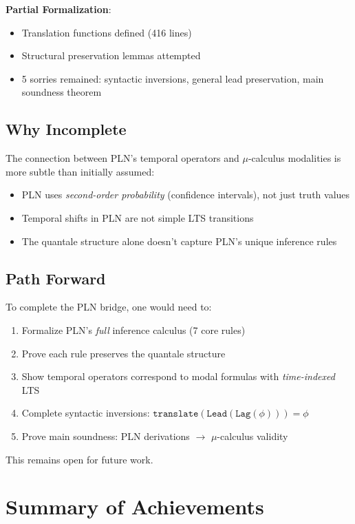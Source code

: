 \documentclass[11pt]{article}
\begin{document}
\textbf{Partial Formalization}:
\begin{itemize}
\item Translation functions defined (416 lines)
\item Structural preservation lemmas attempted
\item 5 sorries remained: syntactic inversions, general lead preservation, main soundness theorem
\end{itemize}

\subsection{Why Incomplete}

The connection between PLN's temporal operators and $\mu$-calculus modalities is more subtle than initially assumed:
\begin{itemize}
\item PLN uses \emph{second-order probability} (confidence intervals), not just truth values
\item Temporal shifts in PLN are not simple LTS transitions
\item The quantale structure alone doesn't capture PLN's unique inference rules
\end{itemize}

\subsection{Path Forward}

To complete the PLN bridge, one would need to:
\begin{enumerate}
\item Formalize PLN's \emph{full} inference calculus (7 core rules)
\item Prove each rule preserves the quantale structure
\item Show temporal operators correspond to modal formulas with \emph{time-indexed} LTS
\item Complete syntactic inversions: $\texttt{translate}(\texttt{Lead}(\texttt{Lag}(\phi))) = \phi$
\item Prove main soundness: PLN derivations $\to$ $\mu$-calculus validity
\end{enumerate}

This remains open for future work.

\section{Summary of Achievements}
\end{document}
